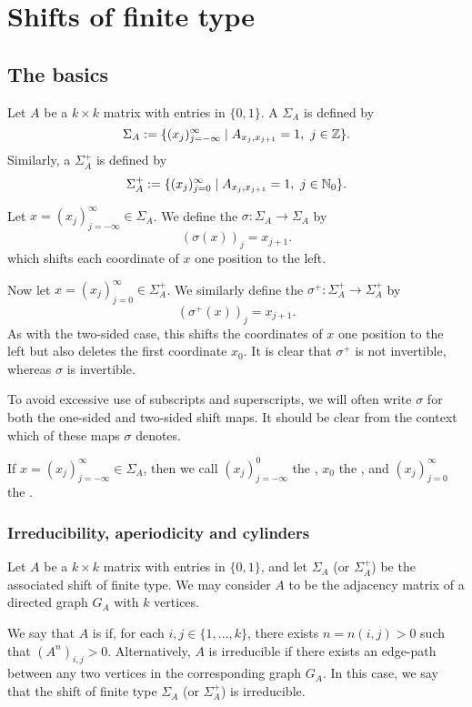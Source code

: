 \chapter{Shifts of finite type} \label{chap:sft}
\section{The basics}
Let $A$ be a $k \times k$ matrix with entries in $\{0, 1\}$. A  $\Sigma_A$ is defined by
\[
	\Sigma_A := \{(x_j)_{j = -\infty}^\infty \mid A_{x_j, x_{j + 1}} = 1,\ j \in \mathbb{Z}\}.
\]
Similarly, a  $\Sigma_A^+$ is defined by
\[
	\Sigma_A^+ := \{(x_j)_{j = 0}^\infty \mid A_{x_j, x_{j + 1}} = 1,\ j \in \mathbb{N}_0\}.
\]

Let $x = (x_j)_{j = -\infty}^\infty \in \Sigma_A$. We define the  $\sigma : \Sigma_A \to \Sigma_A$ by
\[
	(\sigma(x))_j = x_{j + 1}.
\]
which shifts each coordinate of $x$ one position to the left.

Now let $x = (x_j)_{j = 0}^\infty \in \Sigma_A^+$. We similarly define the  $\sigma^+ : \Sigma_A^+ \to \Sigma_A^+$ by
\[
	(\sigma^+(x))_j = x_{j + 1}.
\]
As with the two-sided case, this shifts the coordinates of $x$ one position to the left but also deletes the first coordinate $x_0$. It is clear that $\sigma^+$ is not invertible, whereas $\sigma$ is invertible.

To avoid excessive use of subscripts and superscripts, we will often write $\sigma$ for both the one-sided and two-sided shift maps. It should be clear from the context which of these maps $\sigma$ denotes.

If $x = (x_j)_{j = -\infty}^\infty \in \Sigma_A$, then we call $(x_j)_{j = -\infty}^0$ the , $x_0$ the , and $(x_j)_{j = 0}^\infty$ the .

\subsection{Irreducibility, aperiodicity and cylinders}
Let $A$ be a $k \times k$ matrix with entries in $\{0, 1\}$, and let $\Sigma_A$ (or $\Sigma_A^+$) be the associated shift of finite type. We may consider $A$ to be the adjacency matrix of a directed graph $G_A$ with $k$ vertices.

We say that $A$ is  if, for each $i, j \in \{1, \dots, k\}$, there exists $n = n(i, j) > 0$ such that $(A^n)_{i, j} > 0$. Alternatively, $A$ is irreducible if there exists an edge-path between any two vertices in the corresponding graph $G_A$. In this case, we say that the shift of finite type $\Sigma_A$ (or $\Sigma_A^+$) is irreducible.

